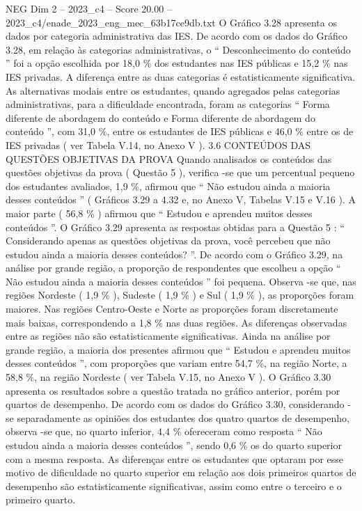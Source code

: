 \begin{textsample}{NEG Dim 2 – 2023\_c4 – Score 20.00 – 2023\_c4/enade\_2023\_eng\_mec\_63b17ce9db.txt}
O Gráfico 3.28 apresenta os dados por categoria administrativa das IES.
De acordo com os dados do Gráfico 3.28, em relação às categorias administrativas, o “ Desconhecimento do conteúdo ” foi a opção escolhida por 18,0 \% dos estudantes nas IES públicas e 15,2 \% nas IES privadas.
A diferença entre as duas categorias é estatisticamente significativa.
As alternativas modais entre os estudantes, quando agregados pelas categorias administrativas, para a dificuldade encontrada, foram as categorias “ Forma diferente de abordagem do conteúdo e Forma diferente de abordagem do conteúdo ”, com 31,0 \%, entre os estudantes de IES públicas e 46,0 \% entre os de IES privadas ( ver Tabela V.14, no Anexo V ). 3.6 CONTEÚDOS DAS QUESTÕES OBJETIVAS DA PROVA Quando analisados os conteúdos das questões objetivas da prova ( Questão 5 ), verifica -se que um percentual pequeno dos estudantes avaliados, 1,9 \%, afirmou que “ Não estudou ainda a maioria desses conteúdos ” ( Gráficos 3.29 a 4.32 e, no Anexo V, Tabelas V.15 e V.16 ).
A maior parte ( 56,8 \% ) afirmou que “ Estudou e aprendeu muitos desses conteúdos ”.
O Gráfico 3.29 apresenta as respostas obtidas para a Questão 5 : “ Considerando apenas as questões objetivas da prova, você percebeu que não estudou ainda a maioria desses conteúdos? ”.
De acordo com o Gráfico 3.29, na análise por grande região, a proporção de respondentes que escolheu a opção “ Não estudou ainda a maioria desses conteúdos ” foi pequena.
Observa -se que, nas regiões Nordeste ( 1,9 \% ), Sudeste ( 1,9 \% ) e Sul ( 1,9 \% ), as proporções foram maiores.
Nas regiões Centro-Oeste e Norte as proporções foram discretamente mais baixas, correspondendo a 1,8 \% nas duas regiões.
As diferenças observadas entre as regiões não são estatisticamente significativas.
Ainda na análise por grande região, a maioria dos presentes afirmou que “ Estudou e aprendeu muitos desses conteúdos ”, com proporções que variam entre 54,7 \%, na região Norte, a 58,8 \%, na região Nordeste ( ver Tabela V.15, no Anexo V ).
O Gráfico 3.30 apresenta os resultados sobre a questão tratada no gráfico anterior, porém por quartos de desempenho.
De acordo com os dados do Gráfico 3.30, considerando -se separadamente as opiniões dos estudantes dos quatro quartos de desempenho, observa -se que, no quarto inferior, 4,4 \% ofereceram como resposta “ Não estudou ainda a maioria desses conteúdos ”, sendo 0,6 \% os do quarto superior com a mesma resposta.
As diferenças entre os estudantes que optaram por esse motivo de dificuldade no quarto superior em relação aos dois primeiros quartos de desempenho são estatisticamente significativas, assim como entre o terceiro e o primeiro quarto.

\end{textsample}
